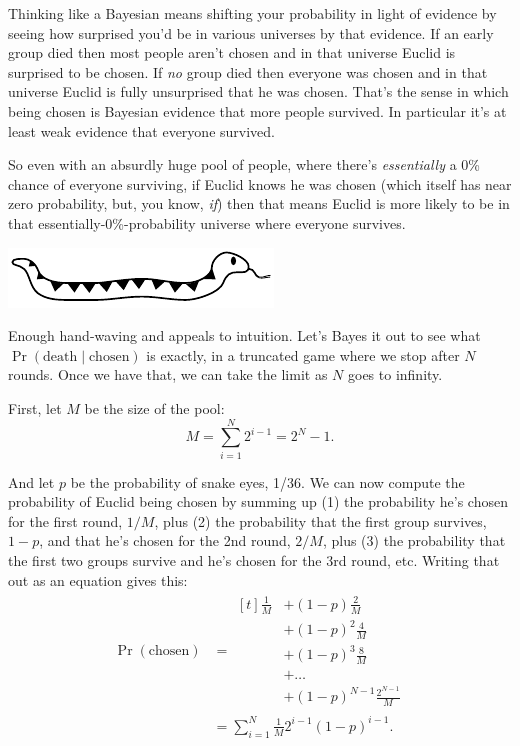 \documentclass[article,twocolumn]{memoir}
\newcommand{\snakedivider}{
\vspace{.2em}
\begin{center}
\includegraphics[width=.25\linewidth]{cute-snake-divider}
\end{center}
\vspace{.1em}
}
\begin{document}
Thinking like a Bayesian means shifting your probability in light of evidence by seeing how surprised you'd be in various universes by that evidence.
If an early group died then most people aren't chosen and in that universe Euclid is surprised to be chosen.
If \emph{no} group died then everyone was chosen and in that universe Euclid is fully unsurprised that he was chosen.
That's the sense in which being chosen is Bayesian evidence that more people survived.
In particular it's at least weak evidence that everyone survived.

So even with an absurdly huge pool of people, where there's \emph{essentially} a 0\% chance of everyone surviving, if Euclid knows he was chosen (which itself has near zero probability, but, you know, \emph{if}) then that means Euclid is more likely to be in that essentially-0\%-probability universe where everyone survives.

\snakedivider

Enough hand-waving and appeals to intuition.
Let's Bayes it out to see what
$\Pr(\text{death}\mid\text{chosen})$
is exactly, in a truncated game where we stop after $N$ rounds.
Once we have that, we can take the limit as $N$ goes to infinity.

First, let $M$ be the size of the pool:
$$M = \sum_{i=1}^{N} 2^{i-1} = 2^N-1.$$

And let $p$ be the probability of snake eyes, 1/36.
We can now compute the probability of Euclid being chosen by summing up 
(1) the probability he's chosen for the first round, $1/M$, plus 
(2) the probability that the first group survives, $1-p$, and that he's chosen for the 2nd round, $2/M$, plus 
(3) the probability that the first two groups survive and he's chosen for the 3rd round, etc.
Writing that out as an equation gives this:
\begin{align*}
\Pr(\text{chosen}) & = 
\begin{aligned}[t]
\tfrac{1}{M} & + (1-p)      \tfrac{2}{M} \\
             & + (1-p)^2    \tfrac{4}{M} \\
             & + (1-p)^3    \tfrac{8}{M} \\
             & + \ldots                  \\
             & + (1-p)^{N-1}\frac{2^{N-1}}{M}
\end{aligned} \\
& = \sum_{i=1}^{N} \tfrac{1}{M} 2^{i-1}(1-p)^{i-1}.
\end{align*}
\end{document}
